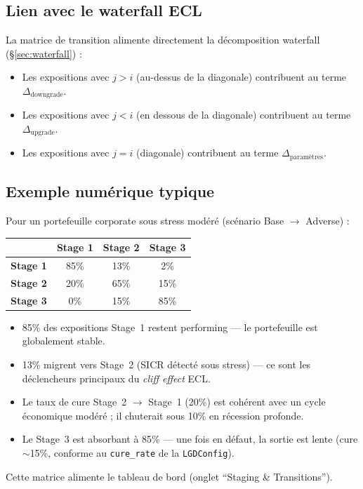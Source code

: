 \documentclass[12pt,a4paper]{article}
\begin{document}
\subsection{Lien avec le waterfall ECL}

La matrice de transition alimente directement la d\'ecomposition waterfall (\S\ref{sec:waterfall}) :
\begin{itemize}
    \item Les expositions avec $j > i$ (au-dessus de la diagonale) contribuent au terme $\Delta_{\text{downgrade}}$.
    \item Les expositions avec $j < i$ (en dessous de la diagonale) contribuent au terme $\Delta_{\text{upgrade}}$.
    \item Les expositions avec $j = i$ (diagonale) contribuent au terme $\Delta_{\text{param\`etres}}$.
\end{itemize}

\subsection{Exemple num\'erique typique}

Pour un portefeuille corporate sous stress mod\'er\'e (sc\'enario Base $\to$ Adverse) :

\begin{center}
\begin{tabular}{l|ccc}
\toprule
& \textbf{Stage 1} & \textbf{Stage 2} & \textbf{Stage 3} \\
\midrule
\textbf{Stage 1} & 85\% & 13\% & 2\% \\
\textbf{Stage 2} & 20\% & 65\% & 15\% \\
\textbf{Stage 3} & 0\%  & 15\% & 85\% \\
\bottomrule
\end{tabular}
\end{center}

\begin{interpretbox}
\begin{itemize}
    \item 85\% des expositions Stage~1 restent performing --- le portefeuille est globalement stable.
    \item 13\% migrent vers Stage~2 (SICR d\'etect\'e sous stress) --- ce sont les d\'eclencheurs principaux du \textit{cliff effect} ECL.
    \item Le taux de cure Stage~2 $\to$ Stage~1 (20\%) est coh\'erent avec un cycle \'economique mod\'er\'e ; il chuterait sous 10\% en r\'ecession profonde.
    \item Le Stage~3 est absorbant \`a 85\% --- une fois en d\'efaut, la sortie est lente (cure $\sim$15\%, conforme au \texttt{cure\_rate} de la \texttt{LGDConfig}).
\end{itemize}
Cette matrice alimente le tableau de bord (onglet ``Staging \& Transitions'').
\end{interpretbox}
\end{document}
